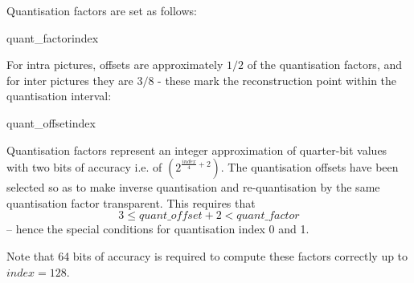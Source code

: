 Quantisation factors are set as follows:

\begin{pseudo}{quant\_factor}{index}
\bsEND
\end{pseudo}

For intra pictures, offsets are approximately $1/2$ of the 
quantisation factors, and for inter pictures they are $3/8$ - these
mark the reconstruction point within the quantisation interval:

\begin{pseudo}{quant\_offset}{index}
\bsELSE
    \bsELSE
    \bsEND
  \bsELSE
  \bsEND
\bsEND
{}
\end{pseudo}

\begin{informative}
Quantisation factors represent an integer approximation of quarter-bit values 
with two bits of accuracy i.e. of $(2^{\frac{index}{4}+2})$.
The quantisation offsets have been selected so as to make inverse quantisation
and re-quantisation by the same quantisation factor transparent. This requires that
\[3\leq quant\_offset+2<quant\_factor\] -- hence the special conditions for quantisation index 0 and 1.

Note that 64 bits of accuracy is required to compute these factors correctly up to $index=128$.
\end{informative}
